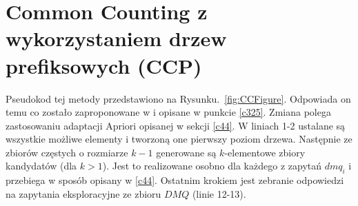 \section{Common Counting z wykorzystaniem drzew prefiksowych (CCP)}
\label{c45}
Pseudokod tej metody przedstawiono na Rysunku.~\ref{fig:CCFigure}. Odpowiada on temu co zostało zaproponowane w \cite{WojciechowskiCC} i opisane w punkcie \ref{c325}. Zmiana polega zastosowaniu adaptacji Apriori opisanej w sekcji \ref{c44}. W liniach 1-2 ustalane są wszystkie możliwe elementy i tworzoną one pierwszy poziom drzewa. Następnie ze zbiorów częstych o rozmiarze \(k-1\) generowane są \(k\)-elementowe zbiory kandydatów (dla \(k > 1\)). Jest to realizowane osobno dla każdego z zapytań \(dmq_i\) i przebiega w sposób opisany w \ref{c44}. Ostatnim krokiem jest zebranie odpowiedzi na zapytania eksploracyjne ze zbioru \(DMQ\) (linie 12-13). 

